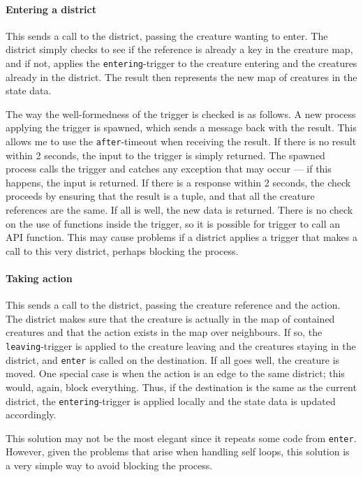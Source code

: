 \paragraph{Entering a district} This sends a call to the district, passing the creature wanting to enter. The district simply checks to see if the reference is already a key in the creature map, and if not, applies the \texttt{entering}-trigger to the creature entering and the creatures already in the district. The result then represents the  new map of creatures in the state data.

The way the well-formedness of the trigger is checked is as follows. A new process applying the trigger is spawned, which sends a message back with the result. This allows me to use the \texttt{after}-timeout when receiving the result. If there is no result within 2 seconds, the input to the trigger is simply returned. The spawned process calls the trigger and catches any exception that may occur --- if this happens, the input is returned. If there is a response within 2 seconds, the check proceeds by ensuring that the result is a tuple, and that all the creature references are the same. If all is well, the new data is returned. There is no check on the use of functions inside the trigger, so it is possible for trigger to call an API function. This may cause problems if a district applies a trigger that makes a call to this very district, perhaps blocking the process.

\paragraph{Taking action} This sends a call to the district, passing the creature reference and the action. The district makes sure that the creature is actually in the map of contained creatures and that the action exists in the map over neighbours. If so, the \texttt{leaving}-trigger is applied to the creature leaving and the creatures staying in the district, and \texttt{enter} is called on the destination. If all goes well, the creature is moved. One special case is when the action is an edge to the same district; this would, again, block everything. Thus, if the destination is the same as the current district, the \texttt{entering}-trigger is applied locally and the state data is updated accordingly.

This solution may not be the most elegant since it repeats some code from \texttt{enter}. However, given the problems that arise when handling self loops, this solution is a very simple way to avoid blocking the process.

